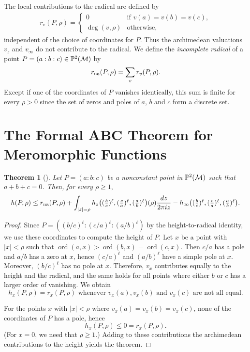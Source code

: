 \documentclass{amsart}
\newcommand\logder{\ell}
\newcommand\ord{\operatorname{ord}}	\newcommand\disc{\operatorname{disc}}
\newtheorem{theorem}{Theorem}[section]
\theoremstyle{definition}\newtheorem{definition}[theorem]{Definition}
\theoremstyle{remark}\newtheorem{remark}[theorem]{Remark}
\numberwithin{equation}{section}
\begin{document}
The local contributions to the radical are defined by
\begin{gather*}
r_v(P,\rho)=\begin{cases}
0	&\text{if }v(a)=v(b)=v(c),\\
\deg(v,\rho)	&\text{otherwise,}
\end{cases}
\end{gather*}
independent of the choice of coordinates for $P$.
Thus the archimedean valuations $v_z$ and $v_\infty$ do not contribute to the radical.
We define the {\em incomplete radical\/} of a point $P=(a:b:c)\in\mathbb{P}^2(\mathcal{M})$ by
\begin{gather*}
r_{\textup{na}}(P,\rho)=\sum_vr_{v}(P,\rho).
\end{gather*}
Except if one of the coordinates of $P$ vanishes identically,
this sum is finite for every $\rho>0$ since the set of zeros and poles of $a$,
$b$ and $c$ form a discrete set.

\section{The Formal ABC Theorem for Meromorphic Functions}
\label{S: formal abc}

\begin{theorem}[\cite{thesis}]\label{L: formal abc}
Let\/ $P=(a:b:c)$ be a nonconstant point in\/ $\mathbb{P}^2(\mathcal{M})$ such that\/ $a+b+c=0$.
Then,
 for every\/ $\rho\geq1,$
\begin{gather*}%
h(P,\rho)\leq r_\na(P,\rho)+\int_{|z|=\rho}h_z\bigl({\textstyle
(\frac bc)^\logder,(\frac ca)^\logder,(\frac ab)^\logder}\bigr)(\rho)\frac{dz}{2\pi iz}
-h_\infty\bigl(\textstyle{(\frac bc)^\logder,(\frac ca)^\logder,(\frac ab)^\logder}\bigr).
\end{gather*}
\end{theorem}

\begin{proof}
Since $P=\left((b/c)^\logder:(c/a)^\logder:(a/b)^\logder\right)$ by the height-to-radical identity,
we use these coordinates to compute the height of $P$.
Let $x$ be a point with $|x|<\rho$ such that $\ord(a,x)>\ord(b,x)=\ord(c,x)$.
Then $c/a$ has a pole and $a/b$ has a zero at $x$,
hence $(c/a)^\logder$ and $(a/b)^\logder$ have a simple pole at $x$.
Moreover,
$(b/c)^\logder$ has no pole at $x$.
Therefore,
 $v_x$ contributes equally to the height and the radical,
and the same holds for all points where either $b$ or $c$ has a larger order of vanishing.
We obtain
$$
h_x(P,\rho)=r_x(P,\rho)\text{ whenever }v_x(a),v_x(b)\text{ and }v_x(c)\text{ are not all equal.}
$$

For the points $x$ with $|x|<\rho$ where $v_x(a)=v_x(b)=v_x(c)$,
none of the coordinates of $P$ has a pole,
hence
$$
h_x(P,\rho)\leq0=r_x(P,\rho).
$$
(For $x=0$,
we need that $\rho\geq1$.)
Adding to these contributions the archimedean contributions to the height yields the theorem.
\end{proof}
\end{document}
